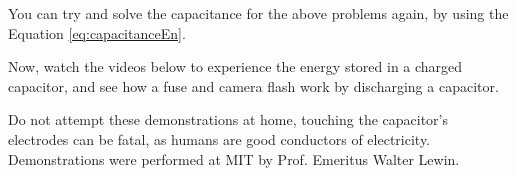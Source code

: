 \documentclass{ximera}
\begin{document}
You can try and solve the capacitance for the above problems again, by using the Equation \ref{eq:capacitanceEn}.

Now, watch the  videos below to experience the energy stored in a charged capacitor, and see  how a fuse and camera flash work by discharging a capacitor.

Do not attempt these demonstrations at home, touching the capacitor's electrodes can be fatal, as humans are good conductors of electricity. Demonstrations were performed at MIT by Prof. Emeritus Walter Lewin.

\begin{center}  
\end{center}


\begin{center}  
\end{center} 
\end{document}
